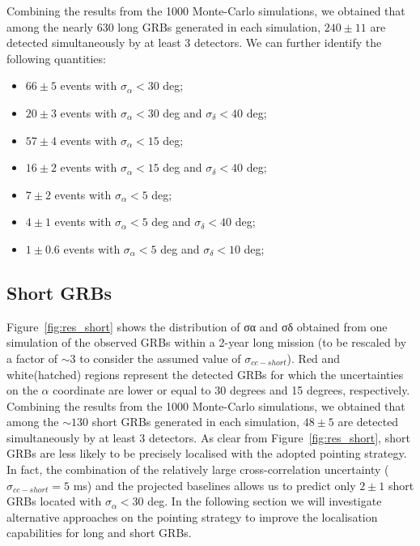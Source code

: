 \documentclass[]{spie}  %
\begin{document}
Combining the results from the 1000 Monte-Carlo simulations, we obtained that among the nearly 630 long GRBs generated in each simulation, $240\pm11$ are detected simultaneously by at least 3 detectors. We can further identify the following quantities:
\begin{itemize}
\item $66\pm5$ events with $\sigma_\alpha < 30$ deg;
\item	$20\pm3$ events with $\sigma_\alpha < 30$ deg and $\sigma_\delta < 40$ deg;
\item	$57\pm4$ events with $\sigma_\alpha < 15$ deg;
\item	$16\pm2$ events with $\sigma_\alpha < 15$ deg and $\sigma_\delta < 40$ deg;
\item	$7\pm2$ events with $\sigma_\alpha < 5$ deg;
\item	$4\pm1$ events with $\sigma_\alpha < 5$ deg and $\sigma_\delta < 40$ deg;
\item	$1\pm0.6$ events with $\sigma_\alpha < 5$ deg and $\sigma_\delta < 10$ deg;
\end{itemize}


\subsection{Short GRBs}

Figure~\ref{fig:res_short} shows the distribution of σα and σδ obtained from one simulation of the observed GRBs within a 2-year long mission (to be rescaled by a factor of $\sim3$ to consider the assumed value of $\sigma_{cc-short}$). Red and white(hatched) regions represent the detected GRBs for which the uncertainties on the $\alpha$ coordinate are lower or equal to 30 degrees and 15 degrees, respectively. Combining the results from the 1000 Monte-Carlo simulations, we obtained that among the $\sim130$ short GRBs generated in each simulation, $48\pm5$ are detected simultaneously by at least 3 detectors. As clear from Figure~\ref{fig:res_short}, short GRBs are less likely to be precisely localised with the adopted pointing strategy. In fact, the combination of the relatively large cross-correlation uncertainty ($\sigma_{cc-short} = 5$ ms) and the projected baselines allows us to predict only $2\pm1$ short GRBs located with $\sigma_\alpha < 30$ deg. In the following section we will investigate alternative approaches on the pointing strategy to improve the localisation capabilities for long and short GRBs.
\end{document}
